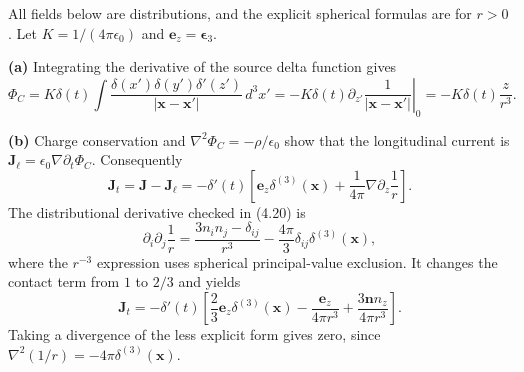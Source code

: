 All fields below are distributions, and the explicit spherical formulas
are for $r>0$. Let $K=1/(4\pi\epsilon_0)$ and
$\mathbf e_z=\boldsymbol\epsilon_3$.

\textbf{(a)} Integrating the derivative of the source delta function gives
\[
\Phi_C=K\delta(t)\int\frac{\delta(x')\delta(y')\delta'(z')}
{|\mathbf x-\mathbf x'|}\,d^3x'
=-K\delta(t)\left.\partial_{z'}\frac1{|\mathbf x-\mathbf x'|}\right|_0
=\boxed{-K\delta(t)\frac z{r^3}}.
\]

\textbf{(b)} Charge conservation and $\nabla^2\Phi_C=-\rho/\epsilon_0$
show that the longitudinal current is
$\mathbf J_\ell=\epsilon_0\nabla\partial_t\Phi_C$.
Consequently
\[
\mathbf J_t=\mathbf J-\mathbf J_\ell
=-\delta'(t)\left[\mathbf e_z\delta^{(3)}(\mathbf x)
+\frac1{4\pi}\nabla\partial_z\frac1r\right].
\]
The distributional derivative checked in (4.20) is
\[
\partial_i\partial_j\frac1r
=\frac{3n_in_j-\delta_{ij}}{r^3}
-\frac{4\pi}{3}\delta_{ij}\delta^{(3)}(\mathbf x),
\]
where the $r^{-3}$ expression uses spherical principal-value exclusion.
It changes the contact term from $1$ to $2/3$ and yields
\[
\boxed{\mathbf J_t=-\delta'(t)\left[
\frac23\mathbf e_z\delta^{(3)}(\mathbf x)
-\frac{\mathbf e_z}{4\pi r^3}
+\frac{3\mathbf n n_z}{4\pi r^3}\right].}
\]
Taking a divergence of the less explicit form gives zero, since
$\nabla^2(1/r)=-4\pi\delta^{(3)}(\mathbf x)$.

